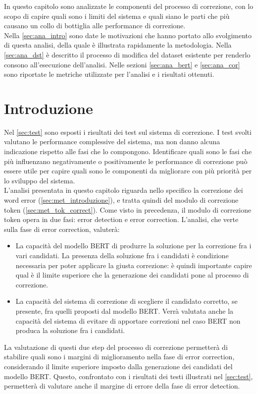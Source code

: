 In questo capitolo sono analizzate le componenti del processo di correzione, con lo scopo di capire quali sono i limiti del sistema e quali siano le parti che più causano un collo di bottiglia alle performance di correzione.\\
Nella \autoref{sec:ana_intro} sono date le motivazioni che hanno portato allo svolgimento di questa analisi, della quale è illustrata rapidamente la metodologia. Nella \autoref{sec:ana_dst} è descritto il processo di modifica del dataset esistente per renderlo consono all'esecuzione dell'analisi. Nelle sezioni \ref{sec:ana_bert} e \ref{sec:ana_cor} sono riportate le metriche utilizzate per l'analisi e i risultati ottenuti.

\section{Introduzione}
\label{sec:ana_intro}
Nel \autoref{sec:test} sono esposti i risultati dei test sul sistema di correzione. I test svolti valutano le performance complessive del sistema, ma non danno alcuna indicazione rispetto alle fasi che lo compongono. Identificare quali sono le fasi che più influenzano negativamente o positivamente le performance di correzione può essere utile per capire quali sono le componenti da migliorare con più priorità per lo sviluppo del sistema.\\
L'analisi presentata in questo capitolo riguarda nello specifico la correzione dei word error (\autoref{sec:met_introduzione}), e tratta quindi del modulo di correzione token (\autoref{sec:met_tok_correct}). Come visto in precedenza, il modulo di correzione token opera in due fasi: error detection e error correction. L'analisi, che verte sulla fase di error correction, valuterà:
\begin{itemize}
\item La capacità del modello BERT di produrre la soluzione per la correzione fra i vari candidati. La presenza della soluzione fra i candidati è condizione necessaria per poter applicare la giusta correzione: è quindi importante capire qual è il limite superiore che la generazione dei candidati pone al processo di correzione.

\item La capacità del sistema di correzione di scegliere il candidato corretto, se presente, fra quelli proposti dal modello BERT. Verrà valutata anche la capacità del sistema di evitare di apportare correzioni nel caso BERT non produca la soluzione fra i candidati.
\end{itemize}
La valutazione di questi due step del processo di correzione permetterà di stabilire quali sono i margini di miglioramento nella fase di error correction, considerando il limite superiore imposto dalla generazione dei candidati del modello BERT. Questo, confrontato con i risultati dei testi illustrati nel \autoref{sec:test}, permetterà di valutare anche il margine di errore della fase di error detection.


